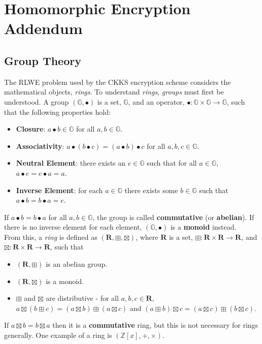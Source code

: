 \chapter{Homomorphic Encryption Addendum}

\section{Group Theory}
\label{app:groups}
\indent \indent
The RLWE problem used by the CKKS encryption scheme considers the mathematical objects, \textit{rings}. To understand \textit{rings}, \textit{groups} must first be understood. A group $(\mathbb{G}, \bullet)$ is a set, $\mathbb{G}$, and an operator, $\bullet: \mathbb{G} \times \mathbb{G} \rightarrow \mathbb{G}$, such that the following properties hold:
\begin{itemize}
    \item \textbf{Closure}: $a \bullet b \in \mathbb{G}$ for all $a,b \in \mathbb{G}$.
    \item \textbf{Associativity}: $a \bullet (b \bullet c) = (a \bullet b) \bullet c$ for all $a, b, c \in \mathbb{G}$.
    \item \textbf{Neutral Element}: there exists an $e \in \mathbb{G}$ such that for all $a \in \mathbb{G}$, $a \bullet e = e \bullet a = a$.
    \item \textbf{Inverse Element}: for each $a \in \mathbb{G}$ there exists some $b \in \mathbb{G}$ such that $a \bullet b = b \bullet a = e$.
\end{itemize}
If $a \bullet b = b \bullet a$ for all $a, b \in \mathbb{G}$, the group is called \textbf{commutative} (or \textbf{abelian}). If there is no inverse element for each element, $(\mathbb{G}, \bullet)$ is a \textbf{monoid} instead.
\bigskip \bigskip \\ \indent
From this, a \textit{ring} is defined as $(\textbf{R}, \boxplus, \boxtimes)$, where $\textbf{R}$ is a set, $\boxplus: \textbf{R} \times \textbf{R} \rightarrow \textbf{R}$, and $\boxtimes: \textbf{R} \times \textbf{R} \rightarrow \textbf{R}$, such that
\begin{itemize}
    \item $(\textbf{R}, \boxplus)$ is an abelian group.
    \item $(\textbf{R}, \boxtimes)$ is a monoid.
    \item $\boxplus$ and $\boxtimes$ are distributive - for all $a, b, c \in \textbf{R}$, $a \boxtimes (b \boxplus c) = (a \boxtimes b) \boxplus (a \boxtimes c)$ and $(a \boxplus b) \boxtimes c = (a \boxtimes c) \boxplus (b \boxtimes c)$.
\end{itemize}
If $a \boxtimes b = b \boxtimes a$ then it is a \textbf{commutative} ring, but this is not necessary for rings generally. One example of a ring is $(\mathbb{Z}[x], +, \times)$.
